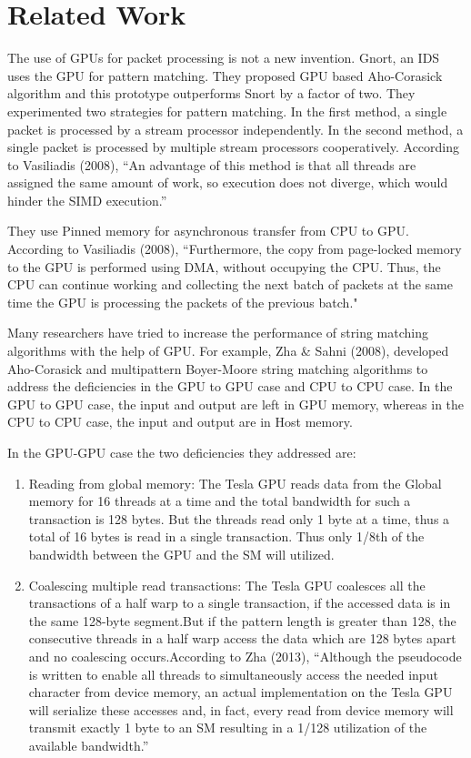 \chapter{Related Work}

The use of GPUs for packet processing is not a new invention. Gnort, an IDS uses the GPU for pattern matching. They proposed GPU based Aho-Corasick algorithm and this prototype outperforms Snort by a factor of two. They experimented two strategies for pattern matching. In the first method, a single packet is processed by a stream processor independently. In the second method, a single packet is processed by multiple stream processors cooperatively. According to Vasiliadis (2008), “An advantage of this method is that all threads are assigned the same amount of work, so execution does not diverge, which would hinder the SIMD execution.”

They use Pinned memory for asynchronous transfer from CPU to GPU. According to Vasiliadis (2008), “Furthermore, the copy from page-locked memory to the GPU is performed using DMA, without occupying the CPU. Thus, the CPU can continue working and collecting the next batch of packets at the same time the GPU is processing the packets of the previous batch." 

Many researchers have tried to increase the performance of string matching algorithms with the help of GPU. For example, Zha \& Sahni (2008), developed Aho-Corasick and multipattern Boyer-Moore string matching algorithms to address the deficiencies in the GPU to GPU case and CPU to CPU case. In the GPU to GPU case, the input and output are left in GPU memory, whereas in the CPU to CPU case, the input and output are in Host memory.

In the GPU-GPU case the two deficiencies they addressed are:

\begin{enumerate}
	\item
	Reading from global memory: The Tesla GPU reads data from the Global memory for 16 threads at a time and the total bandwidth for such a transaction is 128 bytes. But the threads read only 1 byte at a time, thus a total of 16 bytes is read in a single transaction. Thus only 1/8th of the bandwidth between the GPU and the SM will utilized. 
	\item
	Coalescing multiple read transactions: The Tesla GPU coalesces all the transactions of a half warp to a single transaction, if the accessed data is in the same 128-byte segment.But if the pattern length is greater than 128, the consecutive threads in a half warp access the data which are 128 bytes apart and no coalescing occurs.According to Zha (2013), “Although the pseudocode is written to enable all threads to simultaneously access the needed input character from device memory, an actual implementation on the Tesla GPU will serialize these accesses and, in fact, every read from device memory will transmit exactly 1 byte to an SM resulting in a 1/128 utilization of the available bandwidth.”
\end{enumerate}

